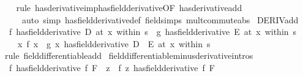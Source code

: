 \begin{isabellebody}
%
\isadelimproof
\ \ %
\endisadelimproof
%
\isatagproof
{}\isamarkupfalse%
\ {\isacharparenleft}{\kern0pt}rule\ has{\isacharunderscore}{\kern0pt}derivative{\isacharunderscore}{\kern0pt}imp{\isacharunderscore}{\kern0pt}has{\isacharunderscore}{\kern0pt}field{\isacharunderscore}{\kern0pt}derivative{\isacharbrackleft}{\kern0pt}OF\ has{\isacharunderscore}{\kern0pt}derivative{\isacharunderscore}{\kern0pt}add{\isacharbrackright}{\kern0pt}{\isacharparenright}{\kern0pt}\isanewline
\ \ \ \ \ {\isacharparenleft}{\kern0pt}auto\ simp{\isacharcolon}{\kern0pt}\ has{\isacharunderscore}{\kern0pt}field{\isacharunderscore}{\kern0pt}derivative{\isacharunderscore}{\kern0pt}def\ field{\isacharunderscore}{\kern0pt}simps\ mult{\isacharunderscore}{\kern0pt}commute{\isacharunderscore}{\kern0pt}abs{\isacharparenright}{\kern0pt}%
\endisatagproof
{\isafoldproof}%
%
\isadelimproof
\isanewline
%
\endisadelimproof
\isanewline
{}\isamarkupfalse%
\ DERIV{\isacharunderscore}{\kern0pt}add{\isacharcolon}{\kern0pt}\isanewline
\ \ {\isachardoublequoteopen}{\isacharparenleft}{\kern0pt}f\ has{\isacharunderscore}{\kern0pt}field{\isacharunderscore}{\kern0pt}derivative\ D{\isacharparenright}{\kern0pt}\ {\isacharparenleft}{\kern0pt}at\ x\ within\ s{\isacharparenright}{\kern0pt}\ {\isasymLongrightarrow}\ {\isacharparenleft}{\kern0pt}g\ has{\isacharunderscore}{\kern0pt}field{\isacharunderscore}{\kern0pt}derivative\ E{\isacharparenright}{\kern0pt}\ {\isacharparenleft}{\kern0pt}at\ x\ within\ s{\isacharparenright}{\kern0pt}\ {\isasymLongrightarrow}\isanewline
\ \ \ \ {\isacharparenleft}{\kern0pt}{\isacharparenleft}{\kern0pt}{\isasymlambda}x{\isachardot}{\kern0pt}\ f\ x\ {\isacharplus}{\kern0pt}\ g\ x{\isacharparenright}{\kern0pt}\ has{\isacharunderscore}{\kern0pt}field{\isacharunderscore}{\kern0pt}derivative\ D\ {\isacharplus}{\kern0pt}\ E{\isacharparenright}{\kern0pt}\ {\isacharparenleft}{\kern0pt}at\ x\ within\ s{\isacharparenright}{\kern0pt}{\isachardoublequoteclose}\isanewline
%
\isadelimproof
\ \ %
\endisadelimproof
%
\isatagproof
{}\isamarkupfalse%
\ {\isacharparenleft}{\kern0pt}rule\ field{\isacharunderscore}{\kern0pt}differentiable{\isacharunderscore}{\kern0pt}add{\isacharparenright}{\kern0pt}%
\endisatagproof
{\isafoldproof}%
%
\isadelimproof
\isanewline
%
\endisadelimproof
\isanewline
{}\isamarkupfalse%
\ field{\isacharunderscore}{\kern0pt}differentiable{\isacharunderscore}{\kern0pt}minus{\isacharbrackleft}{\kern0pt}derivative{\isacharunderscore}{\kern0pt}intros{\isacharbrackright}{\kern0pt}{\isacharcolon}{\kern0pt}\isanewline
\ \ {\isachardoublequoteopen}{\isacharparenleft}{\kern0pt}f\ has{\isacharunderscore}{\kern0pt}field{\isacharunderscore}{\kern0pt}derivative\ f{\isacharprime}{\kern0pt}{\isacharparenright}{\kern0pt}\ F\ {\isasymLongrightarrow}\ {\isacharparenleft}{\kern0pt}{\isacharparenleft}{\kern0pt}{\isasymlambda}z{\isachardot}{\kern0pt}\ {\isacharminus}{\kern0pt}\ {\isacharparenleft}{\kern0pt}f\ z{\isacharparenright}{\kern0pt}{\isacharparenright}{\kern0pt}\ has{\isacharunderscore}{\kern0pt}field{\isacharunderscore}{\kern0pt}derivative\ {\isacharminus}{\kern0pt}f{\isacharprime}{\kern0pt}{\isacharparenright}{\kern0pt}\ F{\isachardoublequoteclose}\isanewline

\end{isabellebody}
